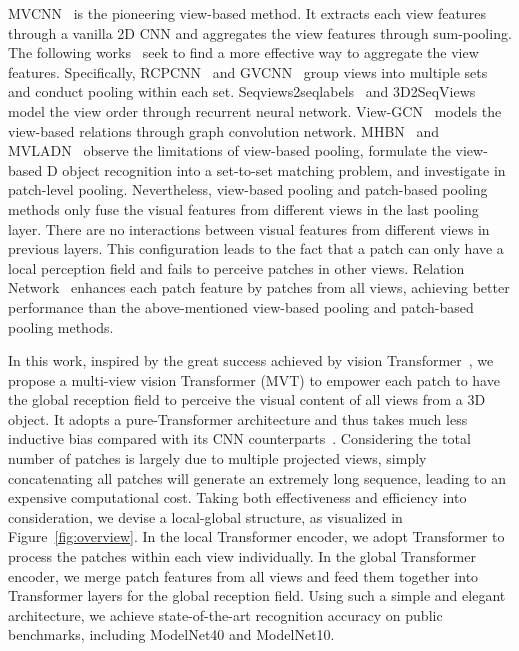 \documentclass{bmvc2k}
\begin{document}
MVCNN~\cite{su2015multi} is the pioneering view-based method. It extracts each view features through a vanilla 2D CNN and aggregates the view features through sum-pooling.  The following works~\cite{wang2017dominant,feng2018gvcnn,kanezaki2018rotationnet,DBLP:journals/tip/HanSLVLZHC19,DBLP:journals/tip/HanLLVLZHC19,Wei_2020_CVPR} seek to find a more effective way to aggregate the view features. Specifically, RCPCNN~\cite{wang2017dominant} and GVCNN~\cite{feng2018gvcnn} group views into multiple sets and conduct pooling within each set. Seqviews2seqlabels~\cite{DBLP:journals/tip/HanSLVLZHC19} and 3D2SeqViews~\cite{DBLP:journals/tip/HanLLVLZHC19} model the view order through recurrent neural network. View-GCN~\cite{Wei_2020_CVPR} models the view-based relations through graph convolution network. MHBN~\cite{yu2018multi} and MVLADN~\cite{DBLP:journals/tip/YuMYY21} observe the limitations of view-based pooling, formulate the view-based D object recognition into a set-to-set matching problem, and investigate in patch-level pooling. Nevertheless,  view-based pooling and patch-based pooling methods only fuse the visual features from different views in the last pooling layer. There are no interactions between visual features from different views in previous layers. This configuration leads to the fact that a  patch can only have a local perception field and fails to perceive patches in other views. Relation Network~\cite{mvrelations} enhances each patch feature by patches from all views, achieving better performance than the above-mentioned view-based pooling and patch-based pooling methods.

In this work, inspired by the great success achieved by vision Transformer~\cite{dosovitskiy2020image,touvron2020training}, we propose a multi-view vision Transformer (MVT) to empower each patch to have the global reception field to perceive the visual content of all views from a 3D object. It adopts a pure-Transformer architecture and thus takes much less inductive bias compared with its CNN counterparts~\cite{dosovitskiy2020image}. Considering the total number of patches is largely due to multiple projected views, simply concatenating all patches will generate an extremely long sequence, leading to an expensive computational cost.  Taking both effectiveness and efficiency into consideration, we devise a local-global structure, as visualized in Figure~\ref{fig:overview}. In the local Transformer encoder, we adopt Transformer to process the patches within each view individually. In the global Transformer encoder, we merge patch features from all views and feed them together into Transformer layers for the global reception field. Using such a simple and elegant architecture, we achieve state-of-the-art recognition accuracy on public benchmarks, including ModelNet40 and  ModelNet10.
\end{document}
